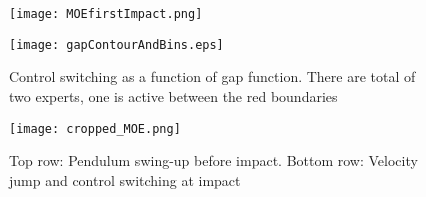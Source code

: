 \begin{figure}[H]
    \centering
    \texttt{[image: MOEfirstImpact.png]}
    \label{fig:cartpole}
\end{figure}

\begin{figure}[H]
    \centering
    \texttt{[image: gapContourAndBins.eps]}
    \caption{Control switching as a function of gap function. There are total of two experts, one is active between the red boundaries}
    \label{fig:gapContour}
\end{figure}

\begin{figure}[H]
    \centering
    \texttt{[image: cropped\_MOE.png]}
    \caption{Top row: Pendulum swing-up before impact. Bottom row: Velocity jump and control switching at impact}
    \label{fig:cartpole_trajectory}
\end{figure}


